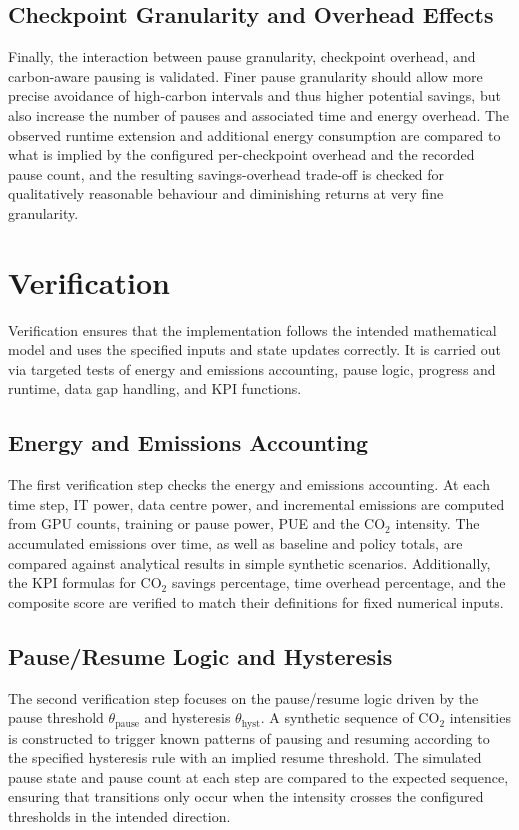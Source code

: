 \subsection{Checkpoint Granularity and Overhead Effects}

Finally, the interaction between pause granularity, checkpoint overhead, and
carbon-aware pausing is validated. Finer pause granularity should allow more
precise avoidance of high-carbon intervals and thus higher potential savings,
but also increase the number of pauses and associated time and energy
overhead. The observed runtime extension and additional energy consumption are
compared to what is implied by the configured per-checkpoint overhead and the
recorded pause count, and the resulting savings-overhead trade-off is checked
for qualitatively reasonable behaviour and diminishing returns at very fine
granularity.

\section{Verification}

Verification ensures that the implementation follows the intended
mathematical model and uses the specified inputs and state updates correctly.
It is carried out via targeted tests of energy and emissions accounting,
pause logic, progress and runtime, data gap handling, and KPI functions.

\subsection{Energy and Emissions Accounting}

The first verification step checks the energy and emissions accounting. At
each time step, IT power, data centre power, and incremental emissions are
computed from GPU counts, training or pause power, PUE and the CO$_2$
intensity. The accumulated emissions over time, as well as baseline and policy
totals, are compared against analytical results in simple synthetic scenarios.
Additionally, the KPI formulas for CO$_2$ savings percentage, time overhead
percentage, and the composite score are verified to match their definitions
for fixed numerical inputs.

\subsection{Pause/Resume Logic and Hysteresis}

The second verification step focuses on the pause/resume logic driven by the
pause threshold $\theta_{\text{pause}}$ and hysteresis
$\theta_{\text{hyst}}$. A synthetic sequence of CO$_2$ intensities is
constructed to trigger known patterns of pausing and resuming according to
the specified hysteresis rule with an implied resume threshold. The simulated
pause state and pause count at each step are compared to the expected
sequence, ensuring that transitions only occur when the intensity crosses the
configured thresholds in the intended direction.

